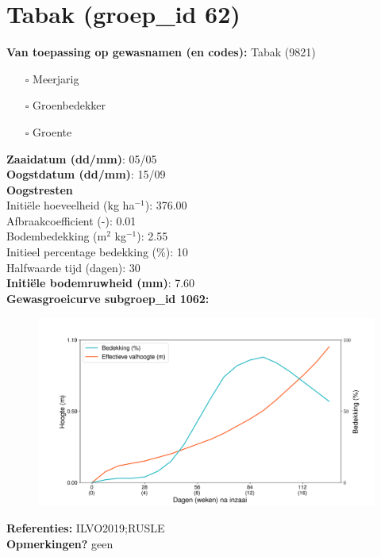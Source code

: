 \documentclass{article}
\begin{document}
 \section{Tabak (groep\_id 62)} 
 \textbf{Van toepassing op gewasnamen (en codes):} Tabak (9821) 
 \begin{multicols}{3} \begin{itemize} \item[$\square$] Meerjarig \item[$\square$] Groenbedekker \item[$\square$] Groente \end{itemize} \end{multicols} 
  \textbf{Zaaidatum (dd/mm)}: 05/05  \vspace{0.10cm} \\ 
  \textbf{Oogstdatum (dd/mm)}: 15/09  \vspace{0.10cm} \\ 
  \textbf{Oogstresten} \vspace{0.05cm} \\ 
  \tab Initi\"{e}le hoeveelheid (kg ha$^{-1}$): 376.00 \vspace{0.05cm} \\ 
  \tab Afbraakcoefficient (-): 0.01 \vspace{0.05cm} \\ 
  \tab Bodembedekking (m$^2$ kg$^{-1}$): 2.55 \vspace{0.05cm} \\ 
  \tab Initieel percentage bedekking (\%): 10 \vspace{0.05cm} \\ 
  \tab Halfwaarde tijd (dagen): 30 \vspace{0.05cm} \\ 
  \textbf{Initi\"{e}le bodemruwheid (mm)}: 7.60 \vspace{0.05cm} \\ 
  \textbf{Gewasgroeicurve subgroep\_id 1062:} 
 \begin{center} \begin{figure}[H] \includegraphics[width=12.5cm]{temp/1062.png} \end{figure} \end{center} 
  \textbf{Referenties:} ILVO2019;RUSLE \vspace{0.10cm} \\ 
  \textbf{Opmerkingen?} geen \vspace{0.10cm} \\ 
 \newpage 
\end{document}
